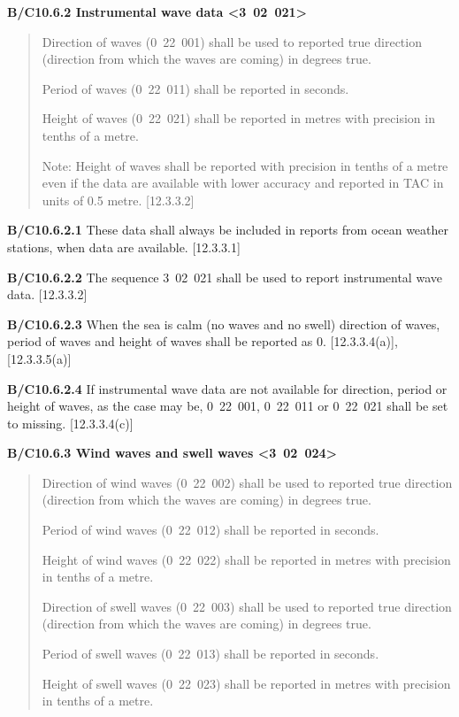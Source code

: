 \textbf{B/C10.6.2 Instrumental wave data \textless3~02~021\textgreater{}}

\begin{quote}
Direction of waves (0~22~001) shall be used to reported true direction (direction from which the waves are coming) in degrees true.

Period of waves (0~22~011) shall be reported in seconds.

Height of waves (0~22~021) shall be reported in metres with precision in tenths of a metre.

Note: Height of waves shall be reported with precision in tenths of a metre even if the data are available with lower accuracy and reported in TAC in units of 0.5 metre. {[}12.3.3.2{]}
\end{quote}

\textbf{B/C10.6.2.1} These data shall always be included in reports from ocean weather stations, when data are available. {[}12.3.3.1{]}

\textbf{B/C10.6.2.2} The sequence 3~02~021 shall be used to report instrumental wave data. {[}12.3.3.2{]}

\textbf{B/C10.6.2.3} When the sea is calm (no waves and no swell) direction of waves, period of waves and height of waves shall be reported as 0. {[}12.3.3.4(a){]}, {[}12.3.3.5(a){]}

\textbf{B/C10.6.2.4} If instrumental wave data are not available for direction, period or height of waves, as the case may be, 0~22~001, 0~22~011 or 0~22~021 shall be set to missing. {[}12.3.3.4(c){]}

\textbf{B/C10.6.3 Wind waves and swell waves \textless3~02~024\textgreater{}}

\begin{quote}
Direction of wind waves (0~22~002) shall be used to reported true direction (direction from which the waves are coming) in degrees true.

Period of wind waves (0~22~012) shall be reported in seconds.

Height of wind waves (0~22~022) shall be reported in metres with precision in tenths of a metre.

Direction of swell waves (0~22~003) shall be used to reported true direction (direction from which the waves are coming) in degrees true.

Period of swell waves (0~22~013) shall be reported in seconds.

Height of swell waves (0~22~023) shall be reported in metres with precision in tenths of a metre.
\end{quote}

